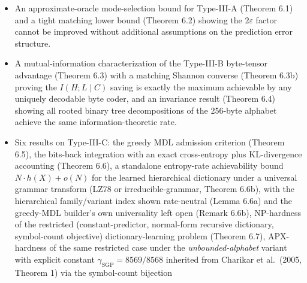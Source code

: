 \documentclass[
]{article}
\begin{document}
\begin{itemize}
  not just marginals --- and a concrete counterexample (at $N=7$,
  $k_v=2$, $s=2$) is included in the paper's verification scripts.
  Lemma 5.7a recovers optimality of top-$Q$ for the
  \emph{permutation-like} (conditional Bernoulli) class of joint laws
  where atom weights factorize as $\Pr(M_v = T) \propto
  \prod_{i \in T} q_i$ (covering the uniform-on-fixed-cardinality
  and log-likelihood-weighted regimes), via a stochastic dominance
  coupling. Lemma 5.7c then closes the complementary direction:
  optimal fixed-size support selection for arbitrary joint laws is
  NP-hard, via a CLIQUE-to-support-selection reduction at $N=3s+1$
  where the algebraic identity $A_s(1) = A_s(2)$ collapses the
  cost to a linear function of the densest-$k$-subgraph value
  $n_0(S)$. Together Lemma 5.7a and Lemma 5.7c form a polynomial-time
  vs.\ NP-hard dichotomy in the joint law's permutation-like structure.
\item
  An approximate-oracle mode-selection bound for Type-III-A (Theorem
  6.1) and a tight matching lower bound (Theorem 6.2) showing the
  $2\varepsilon$ factor cannot be improved without additional
  assumptions on the prediction error structure.
\item
  A mutual-information characterization of the Type-III-B byte-tensor
  advantage (Theorem 6.3) with a matching Shannon converse
  (Theorem 6.3b) proving the $I(H;L\mid C)$ saving is exactly the
  maximum achievable by any uniquely decodable byte coder, and an
  invariance result (Theorem 6.4) showing all rooted binary tree
  decompositions of the 256-byte alphabet achieve the same
  information-theoretic rate.
\item
  Six results on Type-III-C: the greedy MDL admission criterion
  (Theorem 6.5), the bits-back integration with an exact
  cross-entropy plus KL-divergence accounting (Theorem 6.6), a
  standalone entropy-rate achievability bound $N \cdot h(X) + o(N)$ for
  the learned hierarchical dictionary under a universal grammar
  transform (LZ78 or irreducible-grammar, Theorem 6.6b), with the
  hierarchical family/variant index shown rate-neutral (Lemma 6.6a) and
  the greedy-MDL builder's own universality left open (Remark 6.6b),
  NP-hardness of the restricted (constant-predictor, normal-form
  recursive dictionary, symbol-count objective) dictionary-learning
  problem (Theorem 6.7), APX-hardness of the same restricted
  case under the \emph{unbounded-alphabet} variant with explicit
  constant $\gamma_{\mathrm{SGP}} = 8569/8568$ inherited from
  Charikar et al.\ (2005, Theorem 1) via the symbol-count bijection

\end{itemize}
\end{document}
